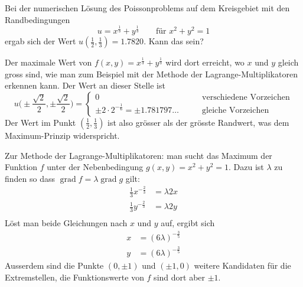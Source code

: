 Bei der numerischen Lösung des Poissonproblems auf dem Kreisgebiet
mit den Randbedingungen
\[
u= x^{\frac13}+y^{\frac13}\qquad \text{für $x^2+y^2=1$}
\]
ergab sich der Wert $u(\frac12,\frac13)=1.7820$.  Kann das sein?

\begin{loesung}
Der maximale Wert von
$f(x,y)= x^{\frac13}+y^{\frac13}$
wird dort erreicht, wo $x$ und $y$
gleich gross sind, wie man zum Beispiel mit der Methode der
Lagrange-Multiplikatoren erkennen kann. Der Wert an dieser Stelle
ist
\[
u\biggl(
\pm\frac{\sqrt{2}}2
,
\pm\frac{\sqrt{2}}2
\biggr)
=\begin{cases}
0
&\qquad\text{verschiedene Vorzeichen}\\
\pm 2\cdot 2^{-\frac16}=\pm1.781797\dots
&\qquad\text{gleiche Vorzeichen}
\end{cases}
\]
Der Wert im Punkt $(\frac12,\frac13)$ ist also grösser als
der grösste Randwert, was dem Maximum-Prinzip widerspricht.

Zur Methode der Lagrange-Multiplikatoren: man sucht das Maximum der
Funktion $f$ unter der Nebenbedingung $g(x,y)=x^2+y^2=1$.
Dazu ist $\lambda$ zu finden so dass
$\operatorname{grad}f=\lambda\operatorname{grad}g$
gilt:
\begin{align*}
\frac13x^{-\frac23}&=\lambda 2x\\
\frac13y^{-\frac23}&=\lambda 2y\\
\end{align*}
Löst man beide Gleichungen nach $x$ und $y$ auf, ergibt sich
\begin{align*}
x&=(6\lambda)^{-\frac35}\\
y&=(6\lambda)^{-\frac35}
\end{align*}
Ausserdem sind die Punkte $(0,\pm 1)$ und $(\pm 1,0)$ weitere
Kandidaten für die Extremstellen, die Funktionswerte von $f$ sind dort
aber $\pm 1$.
\end{loesung}
